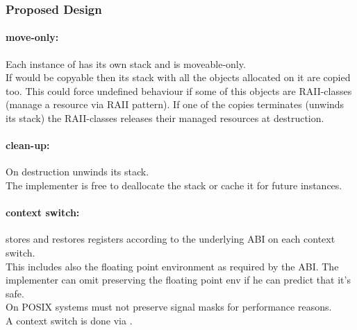 
\subsubsection*{Proposed Design}

\paragraph*{move-only:}
Each instance of \coro has its own stack and is moveable-only.\\
\newline
If \coro would be copyable then its stack with all the objects allocated on it
are copied too. This could force undefined behaviour if some of this objects are
RAII-classes (manage a resource via RAII pattern). If one of the \coro copies
terminates (unwinds its stack) the RAII-classes releases their managed resources
at destruction.

\paragraph*{clean-up:}
On destruction \coro unwinds its stack.\\
\newline
The implementer is free to deallocate the stack or cache it for future \coro
instances.

\paragraph*{context switch:}
\coro stores and restores registers according to the underlying ABI on each
context switch.\\
\newline
This includes also the floating point environment as required by the ABI. The
implementer can omit preserving the floating point env if he can predict that
it's safe.\\
\newline
On POSIX systems \coro must not preserve signal masks for performance reasons.\\
\newline
A context switch is done via \coroop.

